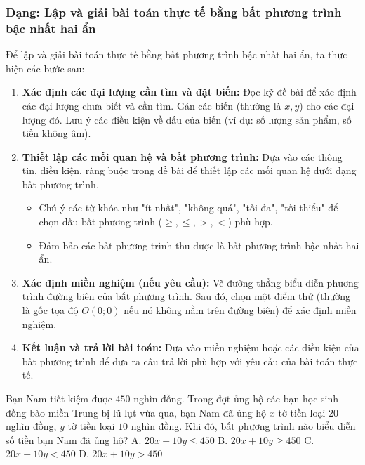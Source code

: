\subsubsection{Dạng: Lập và giải bài toán thực tế bằng bất phương trình bậc nhất hai ẩn}
\begin{phuongphap}
Để lập và giải bài toán thực tế bằng bất phương trình bậc nhất hai ẩn, ta thực hiện các bước sau:
\begin{enumerate}
    \item \textbf{Xác định các đại lượng cần tìm và đặt biến:} Đọc kỹ đề bài để xác định các đại lượng chưa biết và cần tìm. Gán các biến (thường là $x, y$) cho các đại lượng đó. Lưu ý các điều kiện về dấu của biến (ví dụ: số lượng sản phẩm, số tiền không âm).
    \item \textbf{Thiết lập các mối quan hệ và bất phương trình:} Dựa vào các thông tin, điều kiện, ràng buộc trong đề bài để thiết lập các mối quan hệ dưới dạng bất phương trình.
    \begin{itemize}
        \item Chú ý các từ khóa như "ít nhất", "không quá", "tối đa", "tối thiểu" để chọn dấu bất phương trình ($\ge, \le, >, <$) phù hợp.
        \item Đảm bảo các bất phương trình thu được là bất phương trình bậc nhất hai ẩn.
    \end{itemize}
    \item \textbf{Xác định miền nghiệm (nếu yêu cầu):} Vẽ đường thẳng biểu diễn phương trình đường biên của bất phương trình. Sau đó, chọn một điểm thử (thường là gốc tọa độ $O(0;0)$ nếu nó không nằm trên đường biên) để xác định miền nghiệm.
    \item \textbf{Kết luận và trả lời bài toán:} Dựa vào miền nghiệm hoặc các điều kiện của bất phương trình để đưa ra câu trả lời phù hợp với yêu cầu của bài toán thực tế.
\end{enumerate}
\end{phuongphap}
\begin{vidumau}
Bạn Nam tiết kiệm được $450$ nghìn đồng. Trong đợt ủng hộ các bạn học sinh đồng bào miền Trung bị lũ lụt vừa qua, bạn Nam đã ủng hộ $x$ tờ tiền loại $20$ nghìn đồng, $y$ tờ tiền loại $10$ nghìn đồng. Khi đó, bất phương trình nào biểu diễn số tiền bạn Nam đã ủng hộ?
\choice
A. $20x + 10y \le 450$ \True
B. $20x + 10y \ge 450$
C. $20x + 10y < 450$
D. $20x + 10y > 450$
\end{vidumau}

